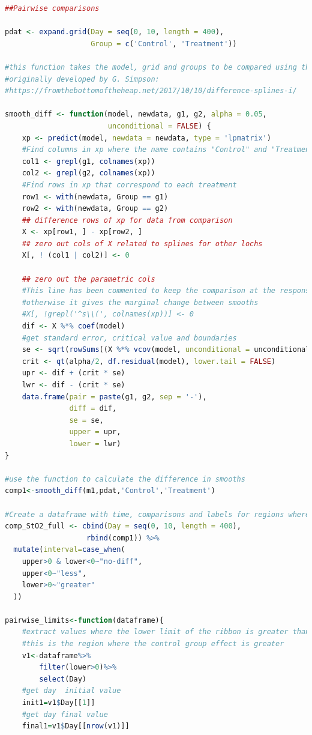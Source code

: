 \documentclass[
]{article}
\begin{document}
\begin{lstlisting}[language=R]
##Pairwise comparisons

pdat <- expand.grid(Day = seq(0, 10, length = 400),
                    Group = c('Control', 'Treatment'))

#this function takes the model, grid and groups to be compared using the lpmatrix
#originally developed by G. Simpson:
#https://fromthebottomoftheheap.net/2017/10/10/difference-splines-i/

smooth_diff <- function(model, newdata, g1, g2, alpha = 0.05,
                        unconditional = FALSE) {
    xp <- predict(model, newdata = newdata, type = 'lpmatrix')
    #Find columns in xp where the name contains "Control" and "Treatment"
    col1 <- grepl(g1, colnames(xp))
    col2 <- grepl(g2, colnames(xp))
    #Find rows in xp that correspond to each treatment
    row1 <- with(newdata, Group == g1)
    row2 <- with(newdata, Group == g2)
    ## difference rows of xp for data from comparison
    X <- xp[row1, ] - xp[row2, ]
    ## zero out cols of X related to splines for other lochs
    X[, ! (col1 | col2)] <- 0
    
    ## zero out the parametric cols
    #This line has been commented to keep the comparison at the response level,
    #otherwise it gives the marginal change between smooths
    #X[, !grepl('^s\\(', colnames(xp))] <- 0
    dif <- X %*% coef(model)
    #get standard error, critical value and boundaries
    se <- sqrt(rowSums((X %*% vcov(model, unconditional = unconditional)) * X))
    crit <- qt(alpha/2, df.residual(model), lower.tail = FALSE)
    upr <- dif + (crit * se)
    lwr <- dif - (crit * se)
    data.frame(pair = paste(g1, g2, sep = '-'),
               diff = dif,
               se = se,
               upper = upr,
               lower = lwr)
}

#use the function to calculate the difference in smooths
comp1<-smooth_diff(m1,pdat,'Control','Treatment')

#Create a dataframe with time, comparisons and labels for regions where difference exists
comp_StO2_full <- cbind(Day = seq(0, 10, length = 400),
                   rbind(comp1)) %>%
  mutate(interval=case_when(
    upper>0 & lower<0~"no-diff",
    upper<0~"less",
    lower>0~"greater"
  ))

pairwise_limits<-function(dataframe){
    #extract values where the lower limit of the ribbon is greater than zero
    #this is the region where the control group effect is greater
    v1<-dataframe%>%
        filter(lower>0)%>%
        select(Day)
    #get day  initial value
    init1=v1$Day[[1]]
    #get day final value
    final1=v1$Day[[nrow(v1)]]


\end{lstlisting}
\end{document}
